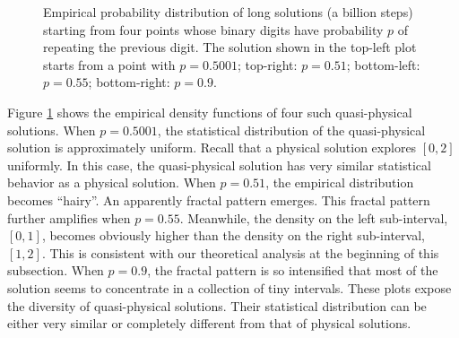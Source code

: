 \documentclass[preprint,12pt]{elsarticle}
\begin{document}
\begin{figure}
\caption{Empirical probability distribution of long solutions (a billion steps)
starting from four points whose binary digits have probability $p$ of
repeating the previous digit.
The solution shown in the top-left plot starts from a point with $p=0.5001$;
top-right: $p=0.51$; bottom-left: $p=0.55$; bottom-right: $p=0.9$.
}
\label{fig:tent_quasiphysical}
\end{figure}

Figure \ref{fig:tent_quasiphysical} shows the empirical density functions of
four such quasi-physical solutions.  When $p=0.5001$,
the statistical distribution of the quasi-physical solution
is approximately uniform.  Recall that a physical solution explores $[0,2]$
uniformly.  In this case, the quasi-physical solution has very similar
statistical behavior as a physical solution.  When $p=0.51$, the empirical
distribution becomes ``hairy''.  An apparently fractal pattern emerges.
This fractal pattern further amplifies when $p=0.55$.  Meanwhile,
the density on the left sub-interval, $[0,1]$, becomes obviously higher than
the density on the right sub-interval, $[1,2]$.  This is consistent with our
theoretical analysis at the beginning of this subsection.
When $p=0.9$, the fractal pattern is so intensified that most
of the solution seems to concentrate in a collection of tiny intervals.
These plots expose the diversity of quasi-physical solutions.
Their statistical distribution can be either
very similar or completely different from that of physical solutions.
\end{document}

